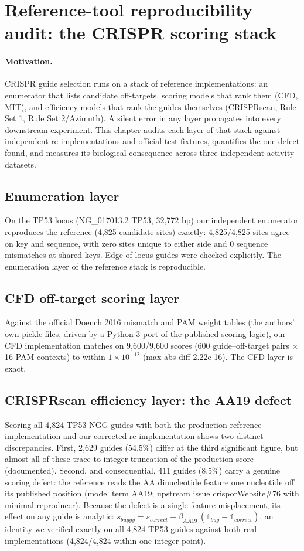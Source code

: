 \section{Reference-tool reproducibility audit: the CRISPR scoring stack}
\paragraph{Motivation.} CRISPR guide selection runs on a stack of reference implementations: an enumerator that lists candidate off-targets, scoring models that rank them (CFD, MIT), and efficiency models that rank the guides themselves (CRISPRscan, Rule Set 1, Rule Set 2/Azimuth). A silent error in any layer propagates into every downstream experiment. This chapter audits each layer of that stack against independent re-implementations and official test fixtures, quantifies the one defect found, and measures its biological consequence across three independent activity datasets.
\subsection{Enumeration layer}
On the TP53 locus (NG\_017013.2 TP53, 32,772 bp) our independent enumerator reproduces the reference (4,825 candidate sites) exactly: 4,825/4,825 sites agree on key and sequence, with zero sites unique to either side and 0 sequence mismatches at shared keys. Edge-of-locus guides were checked explicitly. The enumeration layer of the reference stack is reproducible.
\subsection{CFD off-target scoring layer}
Against the official Doench 2016 mismatch and PAM weight tables (the authors' own pickle files, driven by a Python-3 port of the published scoring logic), our CFD implementation matches on 9,600/9,600 scores (600 guide--off-target pairs $\times$ 16 PAM contexts) to within $1\times10^{-12}$ (max abs diff 2.22e-16). The CFD layer is exact.
\subsection{CRISPRscan efficiency layer: the AA19 defect}
Scoring all 4,824 TP53 NGG guides with both the production reference implementation and our corrected re-implementation shows two distinct discrepancies. First, 2,629 guides (54.5\%) differ at the third significant figure, but almost all of these trace to integer truncation of the production score (documented). Second, and consequential, 411 guides (8.5\%) carry a genuine scoring defect: the reference reads the AA dinucleotide feature one nucleotide off its published position (model term AA19; upstream issue crisporWebsite\#76 with minimal reproducer). Because the defect is a single-feature misplacement, its effect on any guide is analytic: $s_{buggy} = s_{correct} + \beta_{AA19}\,(\mathbb 1_{bug} - \mathbb 1_{correct})$, an identity we verified exactly on all 4,824 TP53 guides against both real implementations (4,824/4,824 within one integer point).
